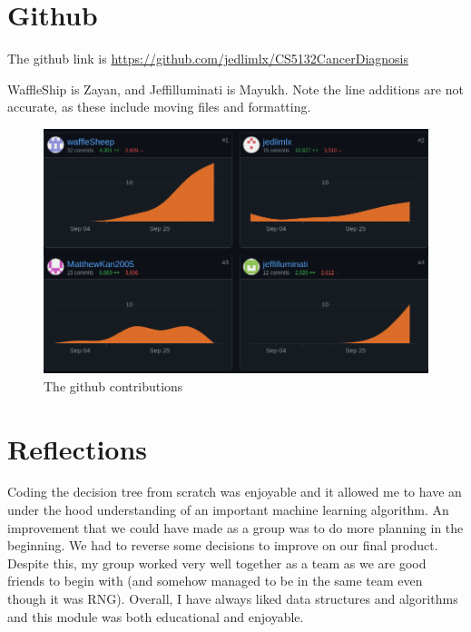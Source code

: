 \newpage
\section{Github}
The github link is \href{https://github.com/jedlimlx/CS5132CancerDiagnosis}{https://github.com/jedlimlx/CS5132CancerDiagnosis}

WaffleShip is Zayan, and Jeffilluminati is Mayukh. Note the line additions are not accurate, as these include moving files and formatting. 

\begin{figure}[ht!]
	\centering
	\includegraphics[width=\linewidth]{github_contrib}
        \caption{The github contributions}
	\label{fig:screenshot}
\end{figure}

\section{Reflections}
 Coding the decision tree from scratch was enjoyable and it allowed me to have an under the hood understanding of an important machine learning algorithm. An improvement that we could have made as a group was to do more planning in the beginning. We had to reverse some decisions to improve on our final product. Despite this, my group worked very well together as a team as we are good friends to begin with (and somehow managed to be in the same team even though it was RNG). Overall, I have always liked data structures and algorithms and this module was both educational and enjoyable.

